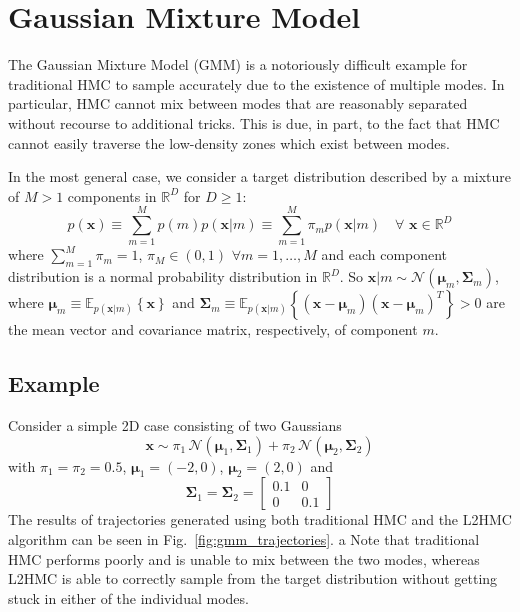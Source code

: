 \section{Gaussian Mixture Model}%
\label{sec:l2hmc_gmm}
%
The Gaussian Mixture Model (GMM) is a notoriously difficult example for
traditional HMC to sample accurately due to the existence of multiple modes.
%
In particular, HMC cannot mix between modes that are reasonably separated
without recourse to additional tricks.
%
This is due, in part, to the fact that HMC cannot easily traverse the
low-density zones which exist between modes.

In the most general case, we consider a target distribution described by a
mixture of $M > 1$ components in
$\mathbb{R}^{D}$ for $D \geq 1$:
%
\begin{equation}
    p(\mathbf{x}) \equiv \sum_{m=1}^{M} p(m) p(\mathbf{x}|m) \equiv
        \sum_{m=1}^{M} \pi_m p(\mathbf{x}|m) \quad \forall \,\,\mathbf{x} \in
        \mathbb{R}^{D}
    \label{eq:gmm_model}
\end{equation}
%
where $\sum_{m=1}^{M} \pi_m = 1$, $\pi_M \in (0, 1)$ $\forall m = 1, \ldots, M$
and each component distribution is a normal probability distribution in
$\mathbb{R}^{D}$.
%
So $\mathbf{x}|m \sim \mathcal{N}(\bm{\mu}_m, \bm{\Sigma}_m)$, where
$\bm{\mu}_m \equiv \mathbb{E}_{p{(\mathbf{x}|m)}}\left\{\mathbf{x}\right\}$ and
$\mathbf{\Sigma}_m \equiv \mathbb{E}_{p{(\mathbf{x}|m)}}{\left\{{(\mathbf{x} -
\bm{\mu}_m)}{(\mathbf{x} - \bm{\mu}_m)}^{T}\right\}} > 0$ are the mean vector
and covariance matrix, respectively, of component $m$.
%
\subsection{Example}
%
Consider a simple 2D case consisting of two Gaussians 
%
\begin{equation}
    \mathbf{x} \sim \pi_1 \,\mathcal{N}(\bm{\mu}_1, \bm{\Sigma}_1) +
        \pi_2\, \mathcal{N}(\bm{\mu}_2, \bm{\Sigma}_2)
    \label{eq:log_likelihood_example}
\end{equation}
%
with $\pi_1 = \pi_2 = 0.5$, $\bm{\mu}_1 = (-2, 0)$, $\bm{\mu}_2 = (2, 0)$ and
%
\begin{equation}
    \bm{\Sigma}_1 = \bm{\Sigma}_2 = 
        \begin{bmatrix}
            0.1    & 0 \\
            0       & 0.1 
        \end{bmatrix}
    \label{eq:covariance_matrix}
\end{equation}
%
The results of trajectories generated using both traditional HMC and the L2HMC
algorithm can be seen in Fig.~\ref{fig:gmm_trajectories}.
a
Note that traditional HMC performs poorly and is unable to mix between the two
modes, whereas L2HMC is able to correctly sample from the target distribution
without getting stuck in either of the individual modes.

